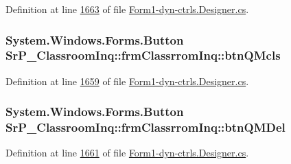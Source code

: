 \-Definition at line \hyperlink{_form1-dyn-ctrls_8_designer_8cs_source_l01663}{1663} of file \hyperlink{_form1-dyn-ctrls_8_designer_8cs_source}{\-Form1-\/dyn-\/ctrls.\-Designer.\-cs}.

\hypertarget{class_sr_p___classroom_inq_1_1frm_classrrom_inq_a5e5ac9d18be5dce770d85fe95daa6801}{
\subsubsection[{btn\-Q\-Mcls}]{\setlength{\rightskip}{0pt plus 5cm}\-System.\-Windows.\-Forms.\-Button {\bf \-Sr\-P\-\_\-\-Classroom\-Inq\-::frm\-Classrrom\-Inq\-::btn\-Q\-Mcls}}}
\label{class_sr_p___classroom_inq_1_1frm_classrrom_inq_a5e5ac9d18be5dce770d85fe95daa6801}


\-Definition at line \hyperlink{_form1-dyn-ctrls_8_designer_8cs_source_l01659}{1659} of file \hyperlink{_form1-dyn-ctrls_8_designer_8cs_source}{\-Form1-\/dyn-\/ctrls.\-Designer.\-cs}.

\hypertarget{class_sr_p___classroom_inq_1_1frm_classrrom_inq_a607596e2d684359b9534981170093cce}{
\subsubsection[{btn\-Q\-M\-Del}]{\setlength{\rightskip}{0pt plus 5cm}\-System.\-Windows.\-Forms.\-Button {\bf \-Sr\-P\-\_\-\-Classroom\-Inq\-::frm\-Classrrom\-Inq\-::btn\-Q\-M\-Del}}}
\label{class_sr_p___classroom_inq_1_1frm_classrrom_inq_a607596e2d684359b9534981170093cce}


\-Definition at line \hyperlink{_form1-dyn-ctrls_8_designer_8cs_source_l01661}{1661} of file \hyperlink{_form1-dyn-ctrls_8_designer_8cs_source}{\-Form1-\/dyn-\/ctrls.\-Designer.\-cs}.

